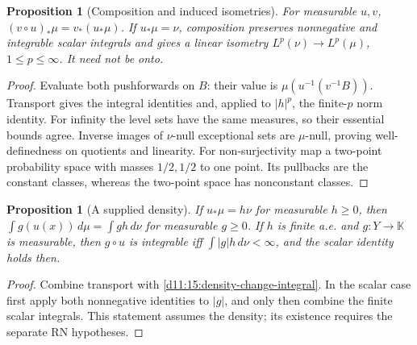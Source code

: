 \documentclass[11pt,oneside,openany]{book}
\newtheorem{proposition}[theorem]{Proposition}
\theoremstyle{definition}
\theoremstyle{remark}
\newcommand{\family}[1]{}
\begin{document}
\begin{proposition}[Composition and induced isometries]\family{D11.09.pushforward_composition}\label{d11:09:pushforward-composition}
For measurable $u,v$, $(v\circ u)_*\mu=v_*(u_*\mu)$. If $u_*\mu=\nu$,
composition preserves nonnegative and integrable scalar integrals and gives
a linear isometry $L^p(\nu)\to L^p(\mu)$, $1\leq p\leq\infty$.
It need not be onto.
\end{proposition}
\begin{proof}
Evaluate both pushforwards on $B$: their value is
$\mu(u^{-1}(v^{-1}B))$. Transport gives the integral identities and,
applied to $|h|^p$, the finite-$p$ norm identity. For infinity the level
sets have the same measures, so their essential bounds agree.
Inverse images of $\nu$-null exceptional sets are $\mu$-null, proving
well-definedness on quotients and linearity. For non-surjectivity map a
two-point probability space with masses $1/2,1/2$ to one point. Its pullbacks are the
constant classes, whereas the two-point space has nonconstant classes.
\end{proof}

\begin{proposition}[A supplied density]\family{D11.09.pushforward_density_bridge}\label{d11:09:pushforward-density-bridge}
If $u_*\mu=h\nu$ for measurable $h\geq0$, then
$\int g(u(x))\,d\mu=\int gh\,d\nu$ for measurable $g\geq0$.
If $h$ is finite a.e. and $g:Y\to\mathbb K$ is measurable, then
$g\circ u$ is integrable iff
$\int|g|h\,d\nu<\infty$, and the scalar identity holds then.
\end{proposition}
\begin{proof}
Combine transport with \cref{d11:15:density-change-integral}. In the scalar
case first apply both nonnegative identities to $|g|$, and only then
combine the finite scalar integrals. This statement assumes the density;
its existence requires the separate RN hypotheses.
\end{proof}
\end{document}
